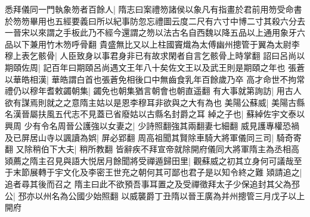 悉拜儀同一門執象笏者百餘人|{
	隋志曰案禮笏諸侯以象凡有指畫於君前用笏受命書於笏笏畢用也五經要義曰所以紀事防忽忘禮圖云度二尺有六寸中博二寸其殺六分去一晉宋以來謂之手板此乃不經今還謂之笏以法古名自西魏以降五品以上通用象牙六品以下兼用竹木笏呼骨翻}
貴盛無比又以上柱國竇熾為太傅幽州摠管于翼為太尉李穆上表乞骸骨|{
	人臣致身以事君身非已有故求閑者自言乞骸骨上時掌翻}
詔曰呂尚以期頤佐周|{
	記百年曰期頤呂尚遇文王年八十矣佐文王以及武王則是期頤之年也}
張蒼以華皓相漢|{
	華皓謂白首也張蒼免相後口中無齒食乳年百餘歲乃卒}
高才命世不拘常禮仍以穆年耆敕蠲朝集|{
	蠲免也朝集猶言朝會也朝直遥翻}
有大事就第詢訪|{
	用古人欲有謀焉則就之之意隋主姑以是恩李穆耳非欲與之大有為也}
美陽公蘇威|{
	美陽古縣名漢晉屬扶風五代志不見蓋已省廢姑以古縣名封爵之耳}
綽之子也|{
	蘇綽佐宇文泰以興周}
少有令名周晉公護強以女妻之|{
	少詩照翻強其兩翻妻七細翻}
威見護專權恐禍及已屏居山寺以諷讀為娯|{
	屏必郢翻}
周高祖聞其賢除車騎大將軍儀同三司|{
	騎奇寄翻}
又除稍伯下大夫|{
	稍所教翻}
皆辭疾不拜宣帝就除開府儀同大將軍隋主為丞相高熲薦之隋主召見與語大悦居月餘聞將受禪遁歸田里|{
	觀蘇威之初其立身何可議哉至于末節展轉于宇文化及李密王世充之朝何其可鄙也君子是以知令終之難}
熲請追之|{
	追者尋其後而召之}
隋主曰此不欲預吾事耳置之及受禪徵拜太子少保追封其父為邳公|{
	邳亦以州名為公國少始照翻}
以威襲爵丁丑隋以晉王廣為并州摠管三月戊子以上開府

